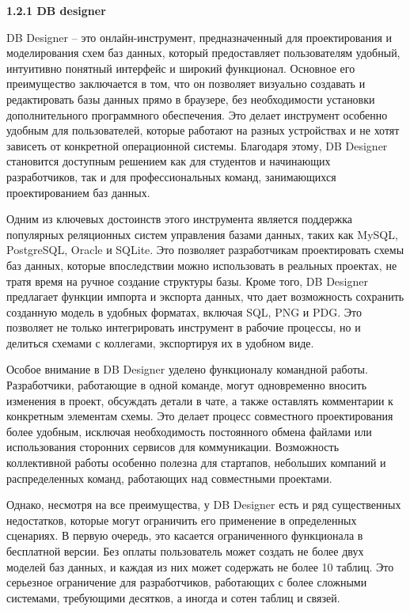\textbf{1.2.1 DB designer }

DB Designer – это онлайн-инструмент, предназначенный для проектирования и моделирования схем баз данных, который предоставляет пользователям удобный, интуитивно понятный интерфейс и широкий функционал. Основное его преимущество заключается в том, что он позволяет визуально создавать и редактировать базы данных прямо в браузере, без необходимости установки дополнительного программного обеспечения. Это делает инструмент особенно удобным для пользователей, которые работают на разных устройствах и не хотят зависеть от конкретной операционной системы. Благодаря этому, DB Designer становится доступным решением как для студентов и начинающих разработчиков, так и для профессиональных команд, занимающихся проектированием баз данных.

Одним из ключевых достоинств этого инструмента является поддержка популярных реляционных систем управления базами данных, таких как MySQL, PostgreSQL, Oracle и SQLite. Это позволяет разработчикам проектировать схемы баз данных, которые впоследствии можно использовать в реальных проектах, не тратя время на ручное создание структуры базы. Кроме того, DB Designer предлагает функции импорта и экспорта данных, что дает возможность сохранить созданную модель в удобных форматах, включая SQL, PNG и PDG. Это позволяет не только интегрировать инструмент в рабочие процессы, но и делиться схемами с коллегами, экспортируя их в удобном виде.

Особое внимание в DB Designer уделено функционалу командной работы. Разработчики, работающие в одной команде, могут одновременно вносить изменения в проект, обсуждать детали в чате, а также оставлять комментарии к конкретным элементам схемы. Это делает процесс совместного проектирования более удобным, исключая необходимость постоянного обмена файлами или использования сторонних сервисов для коммуникации. Возможность коллективной работы особенно полезна для стартапов, небольших компаний и распределенных команд, работающих над совместными проектами.

Однако, несмотря на все преимущества, у DB Designer есть и ряд существенных недостатков, которые могут ограничить его применение в определенных сценариях. В первую очередь, это касается ограниченного функционала в бесплатной версии. Без оплаты пользователь может создать не более двух моделей баз данных, и каждая из них может содержать не более 10 таблиц. Это серьезное ограничение для разработчиков, работающих с более сложными системами, требующими десятков, а иногда и сотен таблиц и связей.

